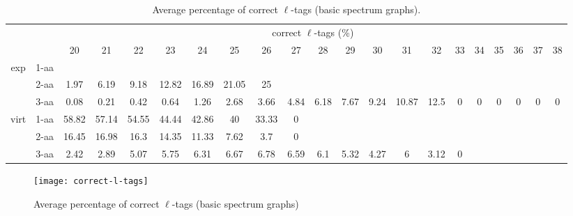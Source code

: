 \documentclass{article}[12pt]
\begin{document}
\begin{landscape}
\begin{table}[h]\tiny
\vspace{3mm}
{\centering
\begin{center}
\begin{tabular}{|c|l|c|c|c|c|c|c|c|c|c|c|c|c|c|c|c|c|c|c|c|}
  \hline
  \multicolumn{2}{|c|}{ } & \multicolumn{ 19 }{|c|}{ correct $\ell$-tags (\%)} \\
  \cline{3- 21}
  \multicolumn{2}{|c|}{ }  & 20 & 21 & 22 & 23 & 24 & 25 & 26 & 27 & 28 & 29 & 30 & 31 & 32 & 33 & 34 & 35 & 36 & 37 & 38\\
  \hline
  \multirow{3}{*}{exp}
&  1-aa  &  &  &  &  &  &  &  &  &  &  &  &  &  &  &  &  &  &  & \\
&  2-aa  & 1.97 & 6.19 & 9.18 & 12.82 & 16.89 & 21.05 & 25 &  &  &  &  &  &  &  &  &  &  &  & \\
&  3-aa  & 0.08 & 0.21 & 0.42 & 0.64 & 1.26 & 2.68 & 3.66 & 4.84 & 6.18 & 7.67 & 9.24 & 10.87 & 12.5 & 0 & 0 & 0 & 0 & 0 & 0\\
 \hline
  \multirow{3}{*}{virt} 
&  1-aa  & 58.82 & 57.14 & 54.55 & 44.44 & 42.86 & 40 & 33.33 & 0 &  &  &  &  &  &  &  &  &  &  & \\
&  2-aa  & 16.45 & 16.98 & 16.3 & 14.35 & 11.33 & 7.62 & 3.7 & 0 &  &  &  &  &  &  &  &  &  &  & \\
&  3-aa  & 2.42 & 2.89 & 5.07 & 5.75 & 6.31 & 6.67 & 6.78 & 6.59 & 6.1 & 5.32 & 4.27 & 6 & 3.12 & 0 &  &  &  &  & \\
 \hline
\end{tabular}
\end{center}
\par}
\centering
\caption{ Average percentage of correct $\ell$-tags (basic spectrum graphs).}
\label{table:correct-l-tags}
\vspace{3mm}
\end{table}

\end{landscape}

\begin{figure}
  \begin{center}
\texttt{[image: correct-l-tags]}
\end{center}
\caption{Average percentage of correct $\ell$-tags (basic spectrum graphs)}
  \label{fig:correct-l-tags}
\end{figure}
\end{document}
